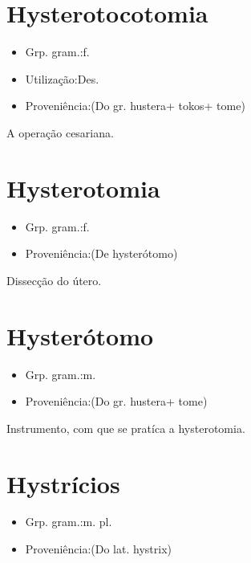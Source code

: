 \documentclass{article}
\begin{document}
\section{Hysterotocotomia}
\begin{itemize}
\item {Grp. gram.:f.}
\end{itemize}
\begin{itemize}
\item {Utilização:Des.}
\end{itemize}
\begin{itemize}
\item {Proveniência:(Do gr. \textunderscore hustera\textunderscore  + \textunderscore tokos\textunderscore  + \textunderscore tome\textunderscore )}
\end{itemize}
A operação cesariana.
\section{Hysterotomia}
\begin{itemize}
\item {Grp. gram.:f.}
\end{itemize}
\begin{itemize}
\item {Proveniência:(De \textunderscore hysterótomo\textunderscore )}
\end{itemize}
Dissecção do útero.
\section{Hysterótomo}
\begin{itemize}
\item {Grp. gram.:m.}
\end{itemize}
\begin{itemize}
\item {Proveniência:(Do gr. \textunderscore hustera\textunderscore  + \textunderscore tome\textunderscore )}
\end{itemize}
Instrumento, com que se pratíca a hysterotomia.
\section{Hystrícios}
\begin{itemize}
\item {Grp. gram.:m. pl.}
\end{itemize}
\begin{itemize}
\item {Proveniência:(Do lat. \textunderscore hystrix\textunderscore )}
\end{itemize}
\end{document}
